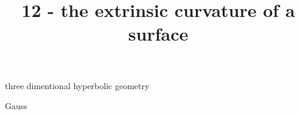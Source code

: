 \documentclass{article}
\title{12 - the extrinsic curvature of a surface}
\newenvironment{andrew_section}[1]
    {
    \section{#1}
    \begin{itemize}
    }
    {
    \end{itemize}
    }
\begin{document}
\maketitle

\begin{andrew_section}{three dimentional hyperbolic geometry}
    \item 
        Gauss
\end{andrew_section}
\end{document}
